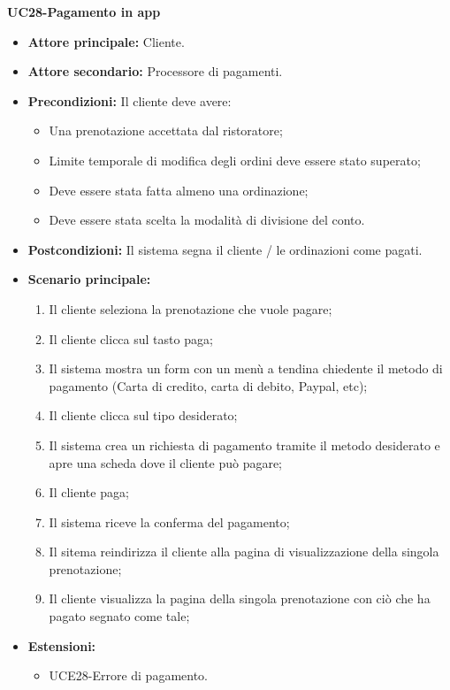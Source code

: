 \textbf{UC28-Pagamento in app}
\begin{itemize}
\item \textbf{Attore principale:} Cliente.
\item \textbf{Attore secondario:} Processore di pagamenti.
\item \textbf{Precondizioni:} Il cliente deve avere:
  \begin{itemize}
    \item Una prenotazione accettata dal ristoratore;
    \item Limite temporale di modifica degli ordini deve essere stato superato;
    \item Deve essere stata fatta almeno una ordinazione;
    \item Deve essere stata scelta la modalità di divisione del conto.
  \end{itemize}
\item \textbf{Postcondizioni:} Il sistema segna il cliente / le ordinazioni come pagati.
\item \textbf{Scenario principale:}
\begin{enumerate}
    \item Il cliente seleziona la prenotazione che vuole pagare;
    \item Il cliente clicca sul tasto paga;
    \item Il sistema mostra un form con un menù a tendina chiedente il metodo di pagamento
      (Carta di credito, carta di debito, Paypal, etc);
    \item Il cliente clicca sul tipo desiderato;
    \item Il sistema crea un richiesta di pagamento tramite il metodo desiderato e 
      apre una scheda dove il cliente può pagare;
    \item Il cliente paga;
    \item Il sistema riceve la conferma del pagamento;
    \item Il sitema reindirizza il cliente alla pagina di visualizzazione della singola prenotazione;
    \item Il cliente visualizza la pagina della singola prenotazione con ciò che ha pagato segnato come tale;
\end{enumerate}
    \item \textbf{Estensioni:}
        \begin{itemize}
                \item UCE28-Errore di pagamento.
        \end{itemize}
\end{itemize}

